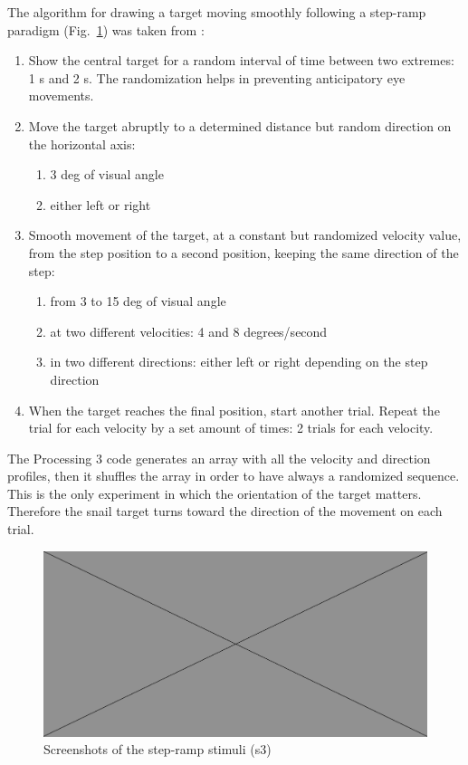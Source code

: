 The algorithm for drawing a target moving smoothly following a step-ramp paradigm (Fig.~\ref{fig:steprampscreens}) was taken from \cite{takarae2004smoothpursuit}:
\begin{enumerate}
    \item Show the central target for a random interval of time between two extremes: 1 s and 2 s. The randomization helps in preventing anticipatory eye movements.
    \item Move the target abruptly to a determined distance but random direction on the horizontal axis:
    \begin{enumerate}[label*=\arabic*.]
        \item 3 deg of visual angle
        \item either left or right
    \end{enumerate}
    \item Smooth movement of the target, at a constant but randomized velocity value, from the step position to a second position, keeping the same direction of the step:
    \begin{enumerate}[label*=\arabic*.]
        \item from 3 to 15 deg of visual angle
        \item at two different velocities: 4 and 8 degrees/second
        \item in two different directions: either left or right depending on the step direction
    \end{enumerate}
    \item When the target reaches the final position, start another trial. Repeat the trial for each velocity by a set amount of times: 2 trials for each velocity.
\end{enumerate}

The Processing 3 code generates an array with all the velocity and direction profiles, then it shuffles the array in order to have always a randomized sequence. This is the only experiment in which the orientation of the target matters. Therefore the snail target turns toward the direction of the movement on each trial.

\begin{figure}[h]
  \centering
  \includegraphics[width=.5\textwidth]{figures/placeholderImg.jpg}
  \caption[step-ramp stimuli screenshots]{Screenshots of the step-ramp stimuli (s3)}
  \label{fig:steprampscreens}
\end{figure}



